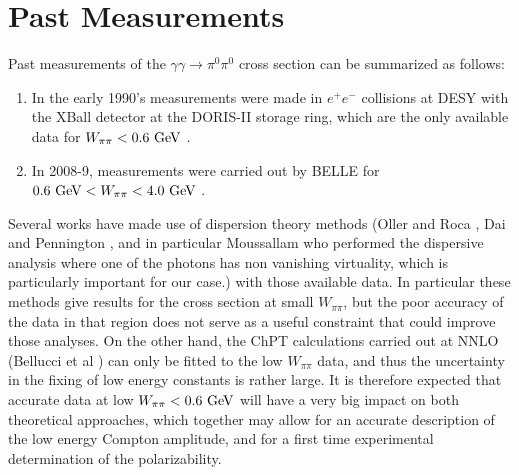 \section{Past Measurements}
Past measurements of the $\gamma\gamma\to \pi^0\pi^0$ cross section can be summarized as follows:
\begin{enumerate}
    \item 
In the early 1990's measurements were made in $e^+e^-$ collisions at DESY   with the XBall detector at the DORIS-II storage ring, which are the only available data for $W_{\pi\pi}<0.6{\rm~ GeV}$ \cite{Marsiske:1990hx}. 
\item In 2008-9, measurements were carried out by BELLE
for $0.6{\rm~ GeV}<W_{\pi\pi}<4.0 {\rm~ GeV}$ \cite{Mori:2007bu,Uehara:2008ep,Uehara:2009cka}. 
\end{enumerate}
Several works have made use of dispersion theory methods (Oller and
Roca \cite{Oller:2008kf}, Dai and Pennington \cite{Dai:2016ytz}, and
in particular Moussallam \cite{Moussallam:2013una} who performed the
dispersive analysis where one of the photons has non vanishing
virtuality, which is particularly important for our case.) with those
available data. In particular these methods give results for the cross
section at small $W_{\pi\pi}$, but the poor accuracy of the data in
that region does not serve as a useful constraint that could improve
those analyses. On the other hand, the ChPT calculations carried out
at NNLO (Bellucci et al \cite{Bellucci:1994hx,Bellucci:1994eb} ) can
only be fitted to the low $W_{\pi\pi}$ data, and thus the uncertainty
in the fixing of low energy constants is rather large. It is therefore
expected that accurate data at low $W_{\pi\pi}<0.6{\rm~ GeV}$ will
have a very big impact on both theoretical approaches, which together
may allow for an accurate description of the low energy Compton
amplitude, and for a first time experimental determination of the
polarizability.
